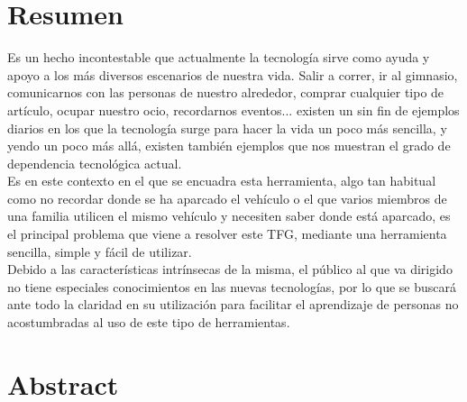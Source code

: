 \chapter{Resumen}

Es un hecho incontestable que actualmente la tecnología sirve como ayuda y apoyo a los más diversos escenarios de nuestra vida. Salir a correr, ir al gimnasio, comunicarnos con las personas de nuestro alrededor, comprar cualquier tipo de artículo, ocupar nuestro ocio, recordarnos eventos... existen un sin fin de ejemplos diarios en los que la tecnología surge para hacer la vida un poco más sencilla, y yendo un poco más allá, existen también ejemplos que nos muestran el grado de dependencia tecnológica actual.\\
Es en este contexto en el que se encuadra esta herramienta, algo tan habitual como no recordar donde se ha aparcado el vehículo o el que varios miembros de una familia utilicen el mismo vehículo y necesiten saber donde está aparcado, es el principal problema que viene a resolver este \ac{TFG}, mediante una herramienta sencilla, simple y fácil de utilizar.\\
Debido a las características intrínsecas de la misma, el público al que va dirigido no tiene especiales conocimientos en las nuevas tecnologías, por lo que se buscará ante todo la claridad en su utilización para facilitar el aprendizaje de personas no acostumbradas al uso de este tipo de herramientas.\\


\chapter{Abstract}


